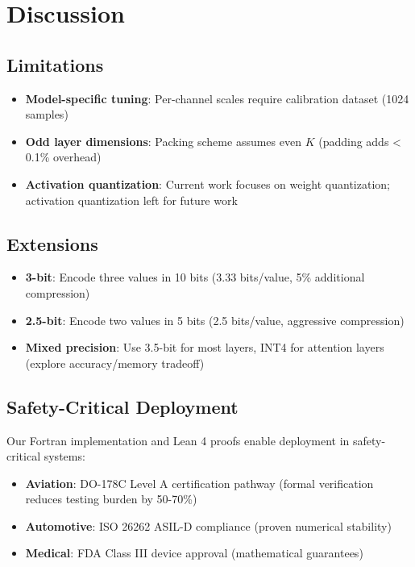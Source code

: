 \documentclass{article}
\begin{document}
\section{Discussion}
\label{sec:discussion}

\subsection{Limitations}

\begin{itemize}
    \item \textbf{Model-specific tuning}: Per-channel scales require calibration dataset (1024 samples)
    \item \textbf{Odd layer dimensions}: Packing scheme assumes even $K$ (padding adds < 0.1\% overhead)
    \item \textbf{Activation quantization}: Current work focuses on weight quantization; activation quantization left for future work
\end{itemize}

\subsection{Extensions}

\begin{itemize}
    \item \textbf{3-bit}: Encode three values in 10 bits (3.33 bits/value, 5\% additional compression)
    \item \textbf{2.5-bit}: Encode two values in 5 bits (2.5 bits/value, aggressive compression)
    \item \textbf{Mixed precision}: Use 3.5-bit for most layers, INT4 for attention layers (explore accuracy/memory tradeoff)
\end{itemize}

\subsection{Safety-Critical Deployment}

Our Fortran implementation and Lean 4 proofs enable deployment in safety-critical systems:

\begin{itemize}
    \item \textbf{Aviation}: DO-178C Level A certification pathway (formal verification reduces testing burden by 50-70\%)
    \item \textbf{Automotive}: ISO 26262 ASIL-D compliance (proven numerical stability)
    \item \textbf{Medical}: FDA Class III device approval (mathematical guarantees)
\end{itemize}
\end{document}
